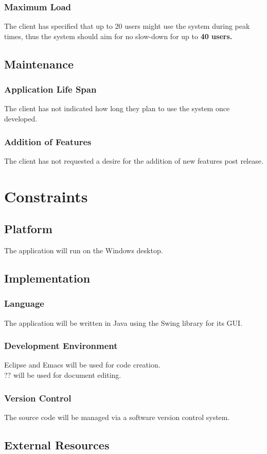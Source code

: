 \documentclass{article}
\begin{document}
\subsubsection{Maximum Load}
The client has specified that up to 20 users might use the system during
peak times, thus the system should aim for no slow-down for up to \textbf{40 users.}
\subsection{Maintenance}
\subsubsection{Application Life Span}
The client has not indicated how long they plan to use the system once developed.
\subsubsection{Addition of Features}
The client has not requested a desire for the addition of new
features post release.

\section{Constraints}
\subsection{Platform}
The application will run on the Windows desktop.
\subsection{Implementation}
\subsubsection{Language}
The application will be written in Java using the Swing library for its GUI.
\subsubsection{Development Environment}
Eclipse and Emacs will be used for code creation.\\
?? will be used for document editing.
\subsubsection{Version Control}
The source code will be managed via a software version control system.
\subsection{External Resources}
\end{document}

